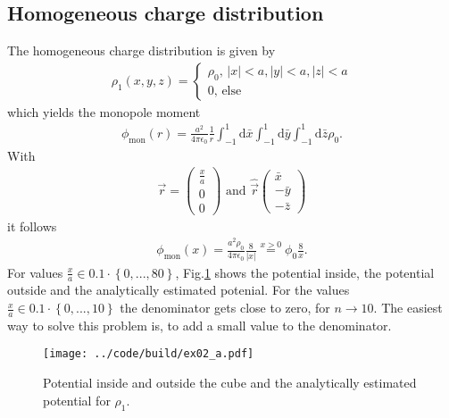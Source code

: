 \subsection{Homogeneous charge distribution}
The homogeneous charge distribution is given by
\begin{align}
    \rho_1 (x,y,z) = \begin{cases}
        \rho_0, \, |x| < a, |y| < a, |z| < a \\
        0, \, \text{else} 
    \end{cases}
\end{align}
which yields the monopole moment
\begin{align}
    \phi_{\text{mon}}(r) = \frac{a^2}{4 \pi \epsilon_0} \frac{1}{r} \int_{-1}^1 \text{d}\bar{x} \int_{-1}^1 \text{d}\bar{y} \int_{-1}^1 \text{d}\bar{z} \rho_0.
\end{align}
With
\begin{align}
    \vec{r} = 
    \begin{pmatrix}
    \frac{x}{a} \\
    0 \\
    0    
    \end{pmatrix} \, \, \text{and} \,\, \hat{\vec{r}}\begin{pmatrix}
        \bar{x} \\
        -\bar{y} \\
        -\bar{z}
    \end{pmatrix}
\end{align}
it follows
\begin{align}
    \phi_{\text{mon}}(x) = \frac{a^2 \rho_0}{4 \pi \epsilon_0} \frac{8}{|x|} \overset{x > 0}{=} \phi_0 \frac{8}{x}.
\end{align}
For values $\frac{x}{a} \in 0.1\cdot\left\{0, ..., 80  \right\} $, Fig.\ref{fig:ex02_a} shows the potential inside, the potential outside and the analytically estimated potenial.  For the values  $\frac{x}{a} \in 0.1\cdot\left\{0, ..., 10  \right\}$ the denominator gets close to zero, for $n \rightarrow 10$. The easiest way to solve this problem is, to add a small value to the denominator.

\begin{figure}[h]
    \centering
    \texttt{[image: ../code/build/ex02\_a.pdf]}
    \caption{Potential inside and outside the cube and the analytically estimated potential for $\rho_1$.}
    \label{fig:ex02_a}
\end{figure}

